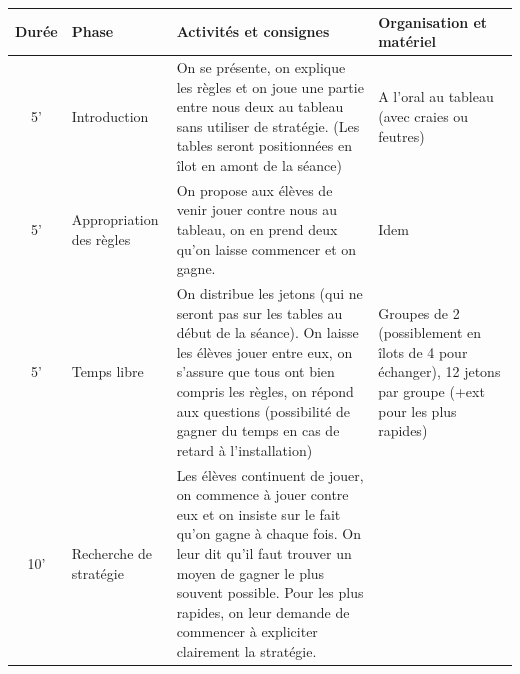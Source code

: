 \documentclass[12pt, a4paper]{article}
\begin{document}
	\begin{longtable}{c|m{3.9cm}|m{8.4cm}|m{2.4cm}}		\textbf{Durée} & \textbf{Phase} & \textbf{Activités et consignes} & \textbf{Organisation et matériel} \\ \hline\hline
		
		5' &
		
		Introduction
		
		&
		
		On se présente, on explique les règles et on joue une partie entre nous deux au tableau sans utiliser de stratégie. (Les tables seront positionnées en îlot en amont de la séance)
		
		& 
		
		A l'oral au tableau (avec craies ou feutres)
		
		\\ \hline
		
		5' &
		
		Appropriation des règles
		
		&
		
		On propose aux élèves de venir jouer contre nous au tableau, on en prend deux qu'on laisse commencer et on gagne.
		
		& Idem
		
		\\ \hline
		
		5' & 
		
		Temps libre
		
		&
		
		On distribue les jetons (qui ne seront pas sur les tables au début de la séance).
		On laisse les élèves jouer entre eux, on s'assure que tous ont bien compris les règles, on répond aux questions (possibilité de gagner du temps en cas de retard à l'installation)
		
		& 
		
		Groupes de 2 (possiblement en îlots de 4 pour échanger), 12 jetons par groupe (+ext pour les plus rapides)
		
		\\ \hline
		
		10'
		
		&
		
		Recherche de stratégie
		
		& 
		
		Les élèves continuent de jouer, on commence à jouer contre eux et on insiste sur le fait qu'on gagne à chaque fois. On leur dit qu'il faut trouver un moyen de gagner le plus souvent possible. Pour les plus rapides, on leur demande de commencer à expliciter clairement la stratégie.
		

\end{longtable}
\end{document}
